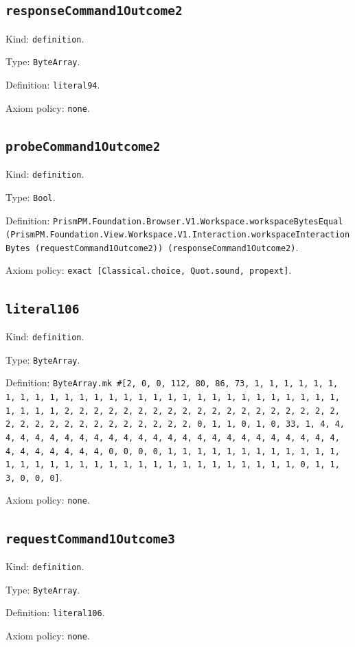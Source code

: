 \documentclass[11pt]{article}
\begin{document}
\subsection*{\texttt{responseCommand1Outcome2}}
\noindent Kind: \texttt{definition}.\par
\noindent Type: \texttt{ByteArray}.\par
\noindent Definition: \texttt{literal94}.\par
\noindent Axiom policy: \texttt{none}.\par
\subsection*{\texttt{probeCommand1Outcome2}}
\noindent Kind: \texttt{definition}.\par
\noindent Type: \texttt{Bool}.\par
\noindent Definition: \texttt{PrismPM.Foundation.Browser.V1.Workspace.workspaceBytesEqual (PrismPM.Foundation.View.Workspace.V1.Interaction.workspaceInteractionBytes (requestCommand1Outcome2)) (responseCommand1Outcome2)}.\par
\noindent Axiom policy: \texttt{exact [Classical.choice, Quot.sound, propext]}.\par
\subsection*{\texttt{literal106}}
\noindent Kind: \texttt{definition}.\par
\noindent Type: \texttt{ByteArray}.\par
\noindent Definition: \texttt{ByteArray.mk \#[2, 0, 0, 112, 80, 86, 73, 1, 1, 1, 1, 1, 1, 1, 1, 1, 1, 1, 1, 1, 1, 1, 1, 1, 1, 1, 1, 1, 1, 1, 1, 1, 1, 1, 1, 1, 1, 1, 1, 1, 2, 2, 2, 2, 2, 2, 2, 2, 2, 2, 2, 2, 2, 2, 2, 2, 2, 2, 2, 2, 2, 2, 2, 2, 2, 2, 2, 2, 2, 2, 2, 2, 0, 1, 1, 0, 1, 0, 33, 1, 4, 4, 4, 4, 4, 4, 4, 4, 4, 4, 4, 4, 4, 4, 4, 4, 4, 4, 4, 4, 4, 4, 4, 4, 4, 4, 4, 4, 4, 4, 4, 4, 0, 0, 0, 0, 1, 1, 1, 1, 1, 1, 1, 1, 1, 1, 1, 1, 1, 1, 1, 1, 1, 1, 1, 1, 1, 1, 1, 1, 1, 1, 1, 1, 1, 1, 1, 1, 0, 1, 1, 3, 0, 0, 0]}.\par
\noindent Axiom policy: \texttt{none}.\par
\subsection*{\texttt{requestCommand1Outcome3}}
\noindent Kind: \texttt{definition}.\par
\noindent Type: \texttt{ByteArray}.\par
\noindent Definition: \texttt{literal106}.\par
\noindent Axiom policy: \texttt{none}.\par
\end{document}
